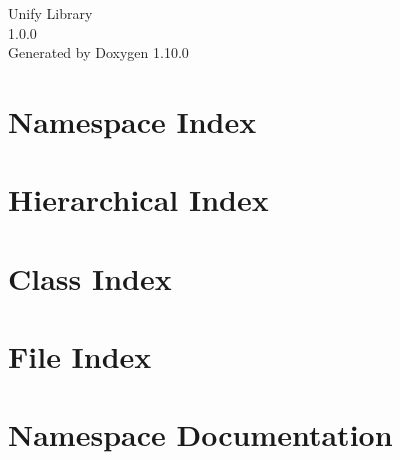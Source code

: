 \documentclass[twoside]{book}
\newcommand{\+}{\discretionary{\mbox{\scriptsize$\hookleftarrow$}}{}{}}
\newcommand{\clearemptydoublepage}{%
    \newpage{\pagestyle{empty}\cleardoublepage}%
  }
\begin{document}
  \raggedbottom
    \hypersetup{pageanchor=false,
                bookmarksnumbered=true,
                pdfencoding=unicode
               }
  \begin{titlepage}
  \vspace*{7cm}
  \begin{center}%
  {\Large Unify Library}\\
  [1ex]\large 1.\+0.\+0 \\
  \vspace*{1cm}
  {\large Generated by Doxygen 1.10.0}\\
  \end{center}
  \end{titlepage}
  \clearemptydoublepage
  \tableofcontents
  \clearemptydoublepage
  \hypersetup{pageanchor=true}

\chapter{Namespace Index}

\chapter{Hierarchical Index}

\chapter{Class Index}

\chapter{File Index}

\chapter{Namespace Documentation}


\end{document}
